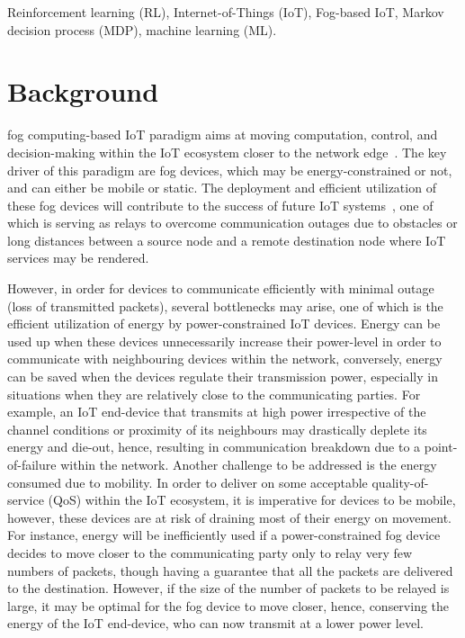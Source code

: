 \documentclass[journal]{IEEEtran}
\begin{document}
\begin{IEEEkeywords}
Reinforcement learning (RL), Internet-of-Things (IoT), Fog-based IoT, Markov decision process (MDP), machine learning (ML).
\end{IEEEkeywords}






%
\IEEEpeerreviewmaketitle

\section{Background}
 fog computing-based IoT paradigm aims at moving computation, control, and decision-making within the IoT ecosystem closer to the network edge~\cite{Omoniwa2018}. The key driver of this paradigm are fog devices, which may be energy-constrained or not, and can either be mobile or static. The deployment and efficient utilization of these fog devices will contribute to the success of future IoT systems~\cite{Chiangh2016}, one of which is serving as relays to overcome communication outages due to obstacles or long distances between a source node and a remote destination node where IoT services may be rendered.

However, in order for devices to communicate efficiently with minimal outage (loss of transmitted packets), several bottlenecks may arise, one of which is the efficient utilization of energy by power-constrained IoT devices. Energy can be used up when these devices unnecessarily increase their power-level in order to communicate with neighbouring devices within the network, conversely, energy can be saved when the devices regulate their transmission power, especially in situations when they are relatively close to the communicating parties. For example, an IoT end-device that transmits at high power irrespective of the channel conditions or proximity of its neighbours may drastically deplete its energy and die-out, hence, resulting in communication breakdown due to a point-of-failure within the network. Another challenge to be addressed is the energy consumed due to mobility. In order to deliver on some acceptable quality-of-service (QoS) within the IoT ecosystem, it is imperative for devices to be mobile, however, these devices are at risk of draining most of their energy on movement. For instance, energy will be inefficiently used if a power-constrained fog device decides to move closer to the communicating party only to relay very few numbers of packets, though having a guarantee that all the packets are delivered to the destination. However, if the size of the number of packets to be relayed is large, it may be optimal for the fog device to move closer, hence, conserving the energy of the IoT end-device, who can now transmit at a lower power level.
\end{document}
